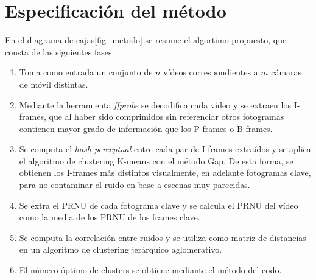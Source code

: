 \section{Especificación del método}
En el diagrama de cajas\ref{fig_metodo} se resume el algortimo propuesto, que consta de las siguientes fases:
\begin{enumerate}
\item Toma como entrada un conjunto de $n$ vídeos correspondientes a $m$ cámaras de móvil distintas.
\item Mediante la herramienta \textit{ffprobe} se decodifica cada vídeo y se extraen los I-frames, que al haber sido comprimidos sin referenciar otros fotogramas contienen mayor grado de información que los P-frames o B-frames. 
\item Se computa el \textit{hash perceptual} entre cada par de I-frames extraídos y se aplica el algoritmo de clustering K-means con el método Gap. De esta forma, se obtienen los I-frames más distintos visualmente, en adelante fotogramas clave,  para no contaminar el ruido en base a escenas muy parecidas.
\item Se extra el PRNU de cada fotograma clave y se calcula el PRNU del vídeo como la media de los PRNU de los frames clave.
\item Se computa la correlación entre ruidos y se utiliza como matriz de distancias en un algoritmo de clustering jerárquico aglomerativo.
\item El número óptimo de clusters se obtiene mediante el método del codo.
\end{enumerate}
